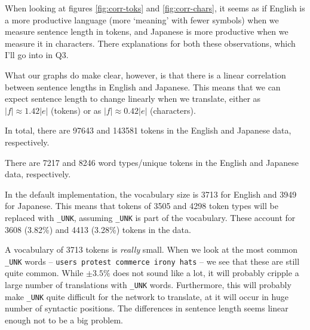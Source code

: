 \documentclass[answers]{exam}
\begin{document}
\begin{CJK}{UTF8}{min}
\begin{questions}
\begin{framed}
\begin{compactenum}[1.]
  \item
    When looking at figures \ref{fig:corr-toks} and \ref{fig:corr-chars}, it
    seems as if English is a more productive language (more `meaning' with fewer
    symbols) when we measure sentence length in tokens, and Japanese is more
    productive when we measure it in characters. There explanations for both
    these observations, which I'll go into in Q3.

    What our graphs do make clear, however, is that there is a linear
    correlation between sentence lengths in English and Japanese. This means
    that we can expect sentence length to change linearly when we translate,
    either as $|f| \approx 1.42|e|$ (tokens) or as $|f| \approx 0.42|e|$
    (characters).
  \item
    In total, there are 97643 and 143581 tokens in the English and Japanese
    data, respectively.
  \item
    There are 7217 and 8246 word types/unique tokens in the English and Japanese
    data, respectively.
  \item
    In the default implementation, the vocabulary size is 3713 for English and
    3949 for Japanese. This means that tokens of 3505 and 4298 token types will
    be replaced with \texttt{\_UNK}, assuming \texttt{\_UNK} is part of the
    vocabulary. These account for 3608 (3.82\%) and 4413 (3.28\%) tokens in the
    data.
  \item
    A vocabulary of 3713 tokens is \emph{really} small. When we look at the most
    common \texttt{\_UNK} words -- \texttt{users protest commerce irony hats} --
    we see that these are still quite common. While $\pm 3.5\%$ does not sound
    like a lot, it will probably cripple a large number of translations with
    \texttt{\_UNK} words. Furthermore, this will probably make \texttt{\_UNK}
    quite difficult for the network to translate, at it will occur in huge
    number of syntactic positions.
    The differences in sentence length seems linear enough not to be a big
    problem.
  \end{compactenum}
\end{framed}



\end{questions}
\end{CJK}
\end{document}
